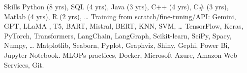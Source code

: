 
\begin{rubric}{Skills}
\entry*[Coding]
Python (8 yrs), SQL (4 yrs), Java (3 yrs), C++ (4 yrs), C\# (3 yrs), Matlab (4 yrs),  R (2 yrs), \ldots
{} Training from scratch/fine-tuning/API: Gemini,  GPT, LLaMA , T5, BART, Mistral, BERT, KNN, SVM,  \ldots
{}
    TensorFlow, Keras, PyTorch, Transformers, LangChain, LangGraph, Scikit-learn, SciPy, Spacy, Numpy, \ldots
\entry*[Visualization]
    Matplotlib, Seaborn, Pyplot, Graphviz, Shiny, Gephi, Power Bi, Jupyter Notebook.
\entry*[Deployment]
    MLOPs practices, Docker, Microsoft Azure, Amazon Web Services, Git.
\end{rubric}